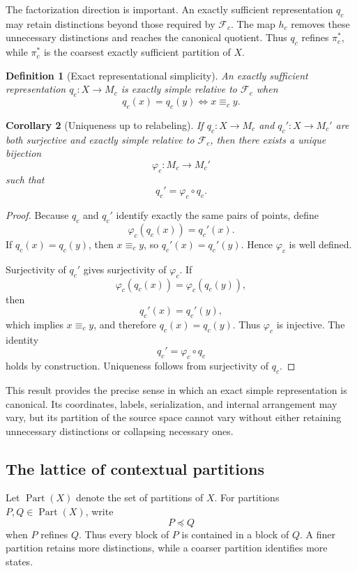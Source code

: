 \documentclass[11pt]{article}
\newtheorem{definition}{Definition}[section]
\newtheorem{corollary}[definition]{Corollary}
\theoremstyle{definition}
\newcommand{\F}{\mathcal{F}}
\begin{document}
The factorization direction is important. An exactly sufficient representation \(q_c\) may retain distinctions beyond those required by \(\F_c\). The map \(h_c\) removes these unnecessary distinctions and reaches the canonical quotient. Thus \(q_c\) refines \(\pi_c^{*}\), while \(\pi_c^{*}\) is the coarsest exactly sufficient partition of \(X\).

\begin{definition}[Exact representational simplicity]
An exactly sufficient representation \(q_c:X\to M_c\) is exactly simple relative to \(\F_c\) when
\[
q_c(x)=q_c(y)
\iff
x\equiv_c y.
\]
\end{definition}

\begin{corollary}[Uniqueness up to relabeling]
If \(q_c:X\to M_c\) and \(q_c':X\to M_c'\) are both surjective and exactly simple relative to \(\F_c\), then there exists a unique bijection
\[
\varphi_c:M_c\to M_c'
\]
such that
\[
q_c'
=
\varphi_c\circ q_c.
\]
\end{corollary}

\begin{proof}
Because \(q_c\) and \(q_c'\) identify exactly the same pairs of points, define
\[
\varphi_c(q_c(x))
=
q_c'(x).
\]
If \(q_c(x)=q_c(y)\), then \(x\equiv_c y\), so \(q_c'(x)=q_c'(y)\). Hence \(\varphi_c\) is well defined.

Surjectivity of \(q_c'\) gives surjectivity of \(\varphi_c\). If
\[
\varphi_c(q_c(x))
=
\varphi_c(q_c(y)),
\]
then
\[
q_c'(x)=q_c'(y),
\]
which implies \(x\equiv_c y\), and therefore \(q_c(x)=q_c(y)\). Thus \(\varphi_c\) is injective. The identity
\[
q_c'=\varphi_c\circ q_c
\]
holds by construction. Uniqueness follows from surjectivity of \(q_c\).
\end{proof}

This result provides the precise sense in which an exact simple representation is canonical. Its coordinates, labels, serialization, and internal arrangement may vary, but its partition of the source space cannot vary without either retaining unnecessary distinctions or collapsing necessary ones.

\subsection{The lattice of contextual partitions}

Let \(\operatorname{Part}(X)\) denote the set of partitions of \(X\). For partitions \(P,Q\in\operatorname{Part}(X)\), write
\[
P\preceq Q
\]
when \(P\) refines \(Q\). Thus every block of \(P\) is contained in a block of \(Q\). A finer partition retains more distinctions, while a coarser partition identifies more states.
\end{document}
